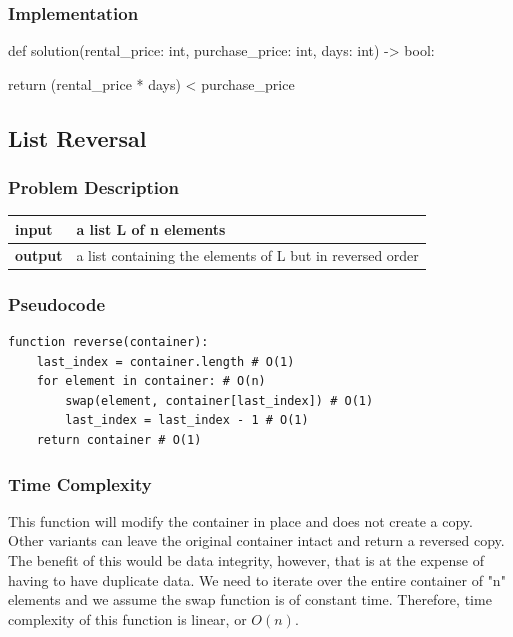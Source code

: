 \documentclass{article}
\begin{document}
\subsubsection{Implementation}

\begin{python}

def solution(rental_price: int,
             purchase_price: int, days: int) -> bool:

    return (rental_price * days) < purchase_price
\end{python}

\newpage

\subsection{List Reversal}

\subsubsection{Problem Description}

\begin{table}[!h]
\begin{tabular}{|l|l|}
\hline
\textbf{input} & a list L of n elements \\ \hline
\textbf{output} & a list containing the elements of L but in reversed order \\ \hline
\end{tabular}
\end{table}

\subsubsection{Pseudocode}

\begin{verbatim}
function reverse(container):
    last_index = container.length # O(1)
    for element in container: # O(n)
        swap(element, container[last_index]) # O(1)
        last_index = last_index - 1 # O(1)
    return container # O(1)
\end{verbatim}

\subsubsection{Time Complexity}

This function will modify the container in place and does not create a copy.
Other variants can leave the original container intact and return a reversed copy.
The benefit of this would be data integrity, however, that is at the expense of having to have duplicate data.
We need to iterate over the entire container of "n" elements and we assume the swap function is of constant time.
Therefore, time complexity of this function is linear, or $O(n)$.
\end{document}
